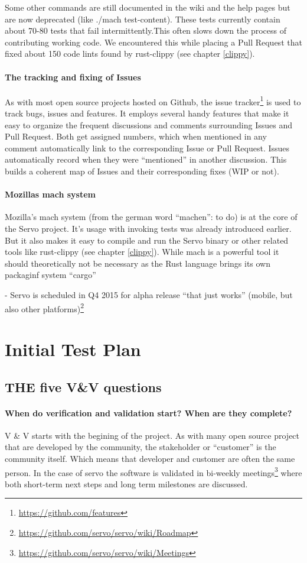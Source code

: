 \documentclass{scrartcl}
\begin{document}
Some other commands are still documented in the wiki and the help pages but are now deprecated (like ./mach test-content). These tests currently contain about 70-80 tests that fail intermittently.This often slows down the process of contributing working code. We encountered this while placing a Pull Request that fixed about 150 code lints found by rust-clippy (see chapter \ref{clippy}).

\paragraph{The tracking and fixing of Issues}
As with most open source projects hosted on Github, the issue tracker\footnote{\url{https://github.com/features}} is used to track bugs, issues and features. It employs several handy features that make it easy to organize the frequent discussions and comments surrounding Issues and Pull Request. Both get assigned numbers, which when mentioned in any comment automatically link to the corresponding Issue or Pull Request. Issues automatically record when they were ``mentioned'' in another discussion. This builds a coherent map of Issues and their corresponding fixes (WIP or not).

\paragraph{Mozillas mach system}
Mozilla's mach system (from the german word ``machen'': to do) is at the core of the Servo project. It's usage with invoking tests was already introduced earlier. But it also makes it easy to compile and run the Servo binary or other related tools like rust-clippy (see chapter \ref{clippy}). While mach is a powerful tool it should theoretically not be necessary as the Rust language brings its own packaginf system ``cargo''


- Servo is scheduled in Q4 2015 for alpha release ``that just works'' (mobile, but also other platforms)\footnote{\url{https://github.com/servo/servo/wiki/Roadmap}}


\section{Initial Test Plan}
\subsection{THE five V\&V questions}
\paragraph{When do verification and validation start? When are they complete?}
V \& V starts with the begining of the project. As with many open source project that are developed by the community, the stakeholder or ``customer'' is the community itself. Which means that developer and customer are often the same person. In the case of servo the software is validated in bi-weekly meetings\footnote{\url{https://github.com/servo/servo/wiki/Meetings}} where both short-term next steps and long term milestones are discussed.\\
  
\end{document}
